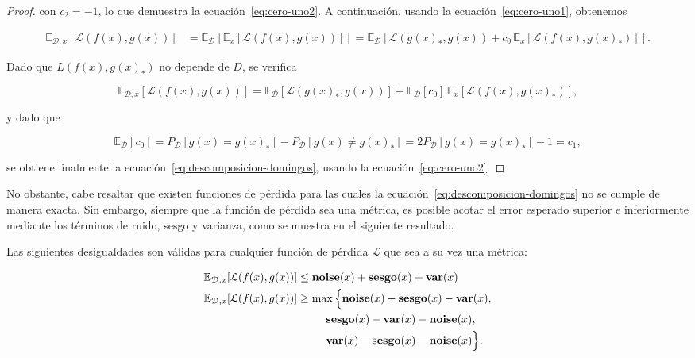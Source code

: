\begin{proof}
    con $c_2 = -1$, lo que demuestra la ecuación~\eqref{eq:cero-uno2}. A continuación, usando la ecuación~\eqref{eq:cero-uno1}, obtenemos

    \begin{align}
        \mathbb{E}_{\mathcal{D}, x}[\mathcal{L}(f(x), g(x))] &= \mathbb{E}_\mathcal{D}[\mathbb{E}_{x}[\mathcal{L}(f(x), g(x))]] = \mathbb{E}_\mathcal{D}[\mathcal{L}(g(x)_*, g(x)) + c_0 \, \mathbb{E}_{x}[\mathcal{L}(f(x), g(x)_*)]].
    \end{align}

    Dado que $L(f(x), g(x)_*)$ no depende de $D$, se verifica

    \begin{equation}
        \mathbb{E}_{\mathcal{D}, x}[\mathcal{L}(f(x), g(x))] = \mathbb{E}_\mathcal{D}[\mathcal{L}(g(x)_*, g(x))] + \mathbb{E}_\mathcal{D}[c_0] \, \mathbb{E}_{x}[\mathcal{L}(f(x), g(x)_*)],
    \end{equation}

    y dado que

    \begin{equation}
        \mathbb{E}_\mathcal{D}[c_0] = P_\mathcal{D}[g(x) = g(x)_*] - P_\mathcal{D}[g(x) \neq g(x)_*] = 2P_\mathcal{D}[g(x) = g(x)_*] - 1 = c_1,
    \end{equation}

    se obtiene finalmente la ecuación~\eqref{eq:descomposicion-domingos}, usando la ecuación~\eqref{eq:cero-uno2}.
\end{proof}

No obstante, cabe resaltar que existen funciones de pérdida para las cuales la ecuación~\eqref{eq:descomposicion-domingos} no se cumple de manera exacta. Sin embargo, siempre que la función de pérdida sea una métrica, es posible acotar el error esperado superior e inferiormente mediante los términos de ruido, sesgo y varianza, como se muestra en el siguiente resultado.

\begin{teorema}
    Las siguientes desigualdades son válidas para cualquier función de pérdida $\mathcal{L}$ que sea a su vez una métrica:

    \begin{align}
        \mathbb{E}_{\mathcal{D}, x}[\mathcal{L}(f(x), g(x))] 
        &\leq \textbf{noise}(x) + \textbf{sesgo}(x) + \textbf{var}(x) \\
        \mathbb{E}_{\mathcal{D}, x}[\mathcal{L}(f(x), g(x))] 
        &\geq \max\Big\{
            \textbf{noise}(x) - \textbf{sesgo}(x) - \textbf{var}(x), \notag \\
            &\hspace{2.6em}
            \textbf{sesgo}(x) - \textbf{var}(x) - \textbf{noise}(x), \notag \\
            &\hspace{2.6em}
            \textbf{var}(x) - \textbf{sesgo}(x) - \textbf{noise}(x)
        \Big\}.
    \end{align}
\end{teorema}

